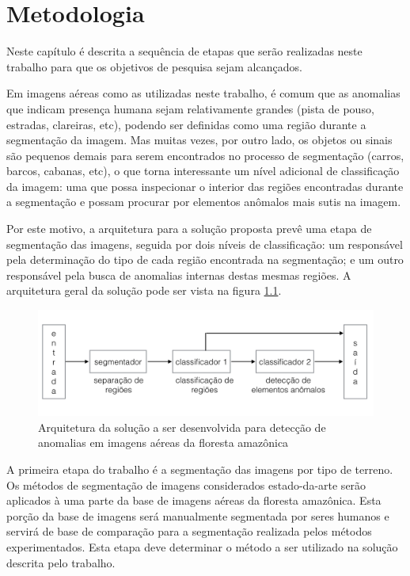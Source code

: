 \chapter{Metodologia}\label{cap:metodologia}

Neste capítulo é descrita a sequência de etapas que serão realizadas neste trabalho para que os objetivos de pesquisa sejam alcançados.

Em imagens aéreas como as utilizadas neste trabalho, é comum que as anomalias que indicam presença humana sejam relativamente grandes (pista de pouso, estradas, clareiras, etc), podendo ser definidas como uma região durante a segmentação da imagem. Mas muitas vezes, por outro lado, os objetos ou sinais são pequenos demais para serem encontrados no processo de segmentação (carros, barcos, cabanas, etc), o que torna interessante um nível adicional de classificação da imagem: uma que possa inspecionar o interior das regiões encontradas durante a segmentação e possam procurar por elementos anômalos mais sutis na imagem.

Por este motivo, a arquitetura para a solução proposta prevê uma etapa de segmentação das imagens, seguida por dois níveis de classificação: um responsável pela determinação do tipo de cada região encontrada na segmentação; e um outro responsável pela busca de anomalias internas destas mesmas regiões. A arquitetura geral da solução pode ser vista na figura \ref{fig:metDiagrama}.

\begin{figure}[h]
    \includegraphics[width=\textwidth]{imgs/arquitetura}
    \caption{Arquitetura da solução a ser desenvolvida para detecção de anomalias em imagens aéreas da floresta amazônica}
    \label{fig:metDiagrama}
\end{figure}

A primeira etapa do trabalho é a segmentação das imagens por tipo de terreno. Os métodos de segmentação de imagens considerados estado-da-arte serão aplicados à uma parte da base de imagens aéreas da floresta amazônica. Esta porção da base de imagens será manualmente segmentada por seres humanos e servirá de base de comparação para a segmentação realizada pelos métodos experimentados. Esta etapa deve determinar o método a ser utilizado na solução descrita pelo trabalho.

